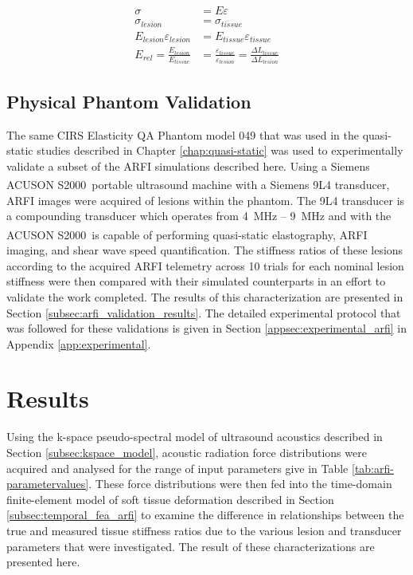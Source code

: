 			\begin{subequations}
				\label{equ:arfi_erel_calculation}
				\begin{align}
					\sigma &= E \varepsilon \\
					\sigma_{lesion} &= \sigma_{tissue} \\
					E_{lesion} \varepsilon_{lesion} &= E_{tissue} \varepsilon_{tissue} \\
					E_{rel} = \frac{E_{lesion}}{E_{tissue}} &= \frac{\varepsilon_{tissue}}{\varepsilon_{lesion}} = \frac{\Delta L_{tissue}}{\Delta L_{lesion}}
				\end{align}
			\end{subequations}

		\FloatBarrier
		\subsection{Physical Phantom Validation}
		\label{subsec:arfi_physical_phantom}
			The same CIRS Elasticity QA Phantom model 049 that was used in the quasi-static studies described in Chapter \ref{chap:quasi-static} was used to experimentally validate a subset of the ARFI simulations described here. Using a Siemens ACUSON S2000\textsuperscript{\texttrademark}\ portable ultrasound machine with a Siemens 9L4 transducer, ARFI images were acquired of lesions within the phantom. The 9L4 transducer is a compounding transducer which operates from \SI{4}{\MHz} -- \SI{9}{\MHz} and with the ACUSON S2000\textsuperscript{\texttrademark}\ is capable of performing quasi-static elastography, ARFI imaging, and shear wave speed quantification. The stiffness ratios of these lesions according to the acquired ARFI telemetry across 10 trials for each nominal lesion stiffness were then compared with their simulated counterparts in an effort to validate the work completed. The results of this characterization are presented in Section \ref{subsec:arfi_validation_results}. The detailed experimental protocol that was followed for these validations is given in Section \ref{appsec:experimental_arfi} in Appendix \ref{app:experimental}.

	\section{Results}
	\label{sec:arfi_results}
		Using the k-space pseudo-spectral model of ultrasound acoustics described in Section \ref{subsec:kspace_model}, acoustic radiation force distributions were acquired and analysed for the range of input parameters give in Table \ref{tab:arfi-parametervalues}. These force distributions were then fed into the time-domain finite-element model of soft tissue deformation described in Section \ref{subsec:temporal_fea_arfi} to examine the difference in relationships between the true and measured tissue stiffness ratios due to the various lesion and transducer parameters that were investigated. The result of these characterizations are presented here.

